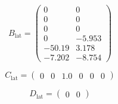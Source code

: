 \documentclass{article}
\begin{document}
\begin{dmath}
B_{\mathrm{lat}}=\left(\begin{array}{cc} 0 & 0\\ 0 & 0\\ 0 & 0\\ 0 & -5.953\\ -50.19 & 3.178\\ -7.202 & -8.754 \end{array}\right)
\end{dmath}

\begin{dmath}
C_{\mathrm{lat}}=\left(\begin{array}{cccccc} 0 & 0 & 1.0 & 0 & 0 & 0 \end{array}\right)
\end{dmath}

\begin{dmath}
D_{\mathrm{lat}}=\left(\begin{array}{cc} 0 & 0 \end{array}\right)
\end{dmath}
\end{document}
